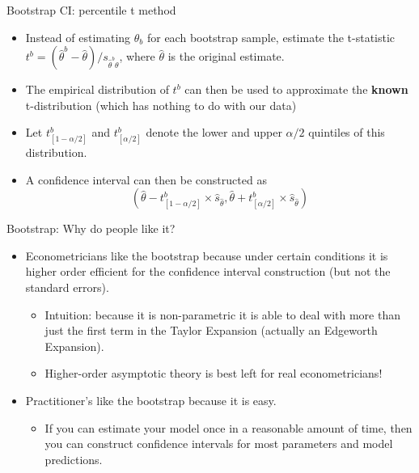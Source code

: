 \begin{frame}{Bootstrap CI: percentile t method}
  \begin{itemize}
    \item Instead of estimating $\theta_b$ for each bootstrap sample, estimate the t-statistic $t^b = (\hat \theta^b - \hat \theta )/ s_{\hat \theta^b \theta}$, where $\hat \theta$ is the original estimate. 
    \item The empirical distribution of $t^b$ can then be used to approximate the \textbf{known} t-distribution (which has nothing to do with our data)
    \item Let $t^b_{[1-\alpha/2]}$ and $t^b_{[\alpha/2]}$ denote the lower and upper $\alpha/2$ quintiles of this distribution. 
    \item A confidence interval can then be constructed as 
    $$ \left( \hat \theta - t^b_{[1-\alpha/2]} \times \hat s_{\hat \theta}, \hat \theta + t^b_{[\alpha/2]} \times \hat s_{\hat \theta} \right) $$
  \end{itemize}
\end{frame}
  
\begin{frame}{Bootstrap: Why do people like it?}
  \begin{itemize}
  \item Econometricians like the bootstrap because under certain conditions it is \alert{higher order efficient} for the confidence interval construction (but not the standard errors).
  \begin{itemize}
  \item Intuition: because it is non-parametric it is able to deal with more than just the first term in the Taylor Expansion (actually an \alert{Edgeworth Expansion}).
  \item Higher-order asymptotic theory is best left for real econometricians!
  \end{itemize}
  \item Practitioner's like the bootstrap because it is easy.
  \begin{itemize}
  \item If you can estimate your model once in a reasonable amount of time, then you can construct confidence intervals for most parameters and model predictions.
  \end{itemize}
  \end{itemize}
  \end{frame}
  

